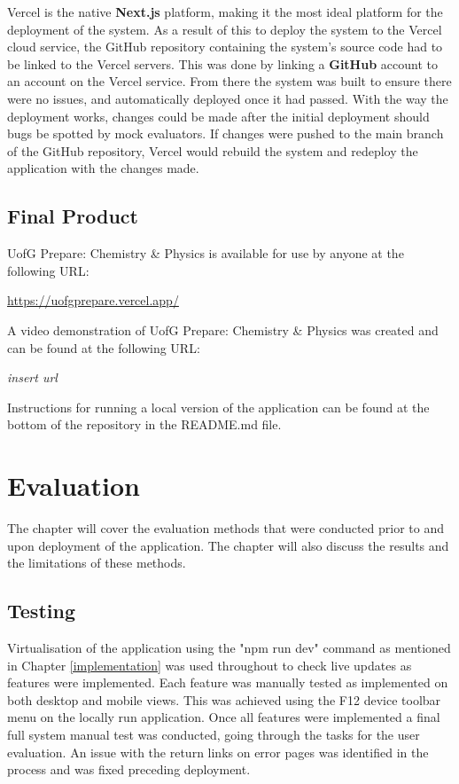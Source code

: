 \documentclass{l4proj}
\begin{document}
Vercel is the native \textbf{Next.js} platform,  making it the most ideal platform for the deployment of the system. As a result of this to deploy the system to the Vercel cloud service,  the GitHub repository containing the system's source code had to be linked to the Vercel servers. This was done by linking a \textbf{GitHub} account to an account on the Vercel service. From there the system was built to ensure there were no issues,  and automatically deployed once it had passed. With the way the deployment works,  changes could be made after the initial deployment should bugs be spotted by mock evaluators. If changes were pushed to the main branch of the GitHub repository,  Vercel would rebuild the system and redeploy the application with the changes made.

\section{Final Product}
UofG Prepare: Chemistry \& Physics is available for use by anyone at the following URL:

\url{https://uofgprepare.vercel.app/}

A video demonstration of UofG Prepare: Chemistry \& Physics was created and can be found at the following URL:

\textit{insert url}

Instructions for running a local version of the application can be found at the bottom of the repository in the README.md file.

\chapter{Evaluation}

The chapter will cover the evaluation methods that were conducted prior to and upon deployment of the application. The chapter will also discuss the results and the limitations of these methods.

\section{Testing}
Virtualisation of the application using the "npm run dev" command as mentioned in Chapter \ref{implementation} was used throughout to check live updates as features were implemented. Each feature was manually tested as implemented on both desktop and mobile views. This was achieved using the F12 device toolbar menu on the locally run application. Once all features were implemented a final full system manual test was conducted,  going through the tasks for the user evaluation. An issue with the return links on error pages was identified in the process and was fixed preceding deployment.
\end{document}
